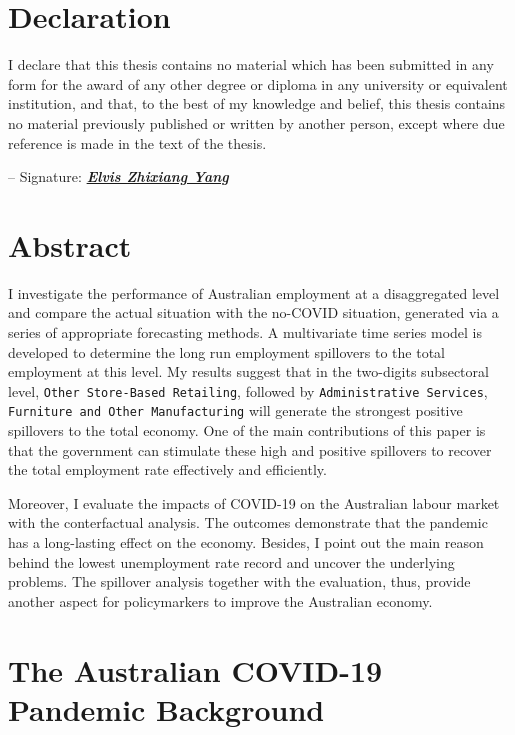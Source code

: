 \documentclass{monashthesis}
\begin{document}
\hypertarget{declaration}{%
\chapter*{Declaration}\label{declaration}}

I declare that this thesis contains no material which has been submitted in any form for the award of any other degree or diploma in any university or equivalent institution, and that, to the best of my knowledge and belief, this thesis contains no material previously published or written by another person, except where due reference is made in the text of the thesis.

\vspace{12pt}

-- Signature: \underline{\emph{\textbf{Elvis Zhixiang Yang}}}

\hypertarget{abstract}{%
\chapter*{Abstract}\label{abstract}}

I investigate the performance of Australian employment at a disaggregated level and compare the actual situation with the no-COVID situation, generated via a series of appropriate forecasting methods. A multivariate time series model is developed to determine the long run employment spillovers to the total employment at this level. My results suggest that in the two-digits subsectoral level, \texttt{Other\ Store-Based\ Retailing}, followed by \texttt{Administrative\ Services}, \texttt{Furniture\ and\ Other\ Manufacturing} will generate the strongest positive spillovers to the total economy. One of the main contributions of this paper is that the government can stimulate these high and positive spillovers to recover the total employment rate effectively and efficiently.

Moreover, I evaluate the impacts of COVID-19 on the Australian labour market with the conterfactual analysis. The outcomes demonstrate that the pandemic has a long-lasting effect on the economy. Besides, I point out the main reason behind the lowest unemployment rate record and uncover the underlying problems. The spillover analysis together with the evaluation, thus, provide another aspect for policymarkers to improve the Australian economy.

\hypertarget{the-australian-covid-19-pandemic-background}{%
\chapter{The Australian COVID-19 Pandemic Background}\label{the-australian-covid-19-pandemic-background}}
\end{document}
